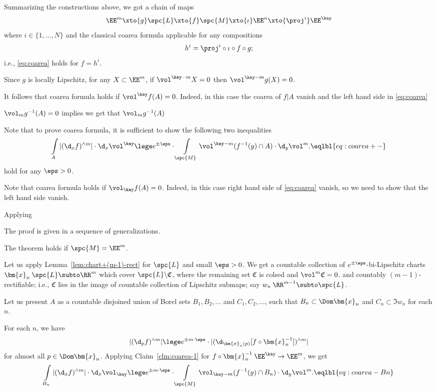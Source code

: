 Summarizing the constructions above, we got a chain of maps
$$\EE^m
\xto{g}
\spc{L}
\xto{f}
\spc{M}
\xto{\iota}\EE^n
\xto{\proj^i}\EE^\kay
$$
where $i\in\{1,\dots,N\}$ and the classical coarea formula applicable 
for any compositions 
$$h^i=\proj^i\circ\iota\circ f\circ g;$$
i.e., \ref{eq:coarea} holds for $f=h^i$.

Since $g$ is locally Lipschitz,
for any $X\subset \EE^m$,
if $\vol^{\kay-m} X=0$ 
then $\vol^{\kay-m} g(X)=0$.

It follows that coarea formula holds if $\vol^\kay f(A)=0$.
Indeed, in this case the coarea of $f|A$ vanish
and the left hand side in \ref{eq:coarea}


$\vol_m g^{-1}(A)=0$ implies 
we get that $\vol_m g^{-1}(A)$


Note that to prove coarea formula, 
it is sufficient to show the following two inequalities
\[
\int\limits_A|(\d_x f)^{\wedge m}|\cdot\d_x\vol^\kay
\lege
e^{\pm\eps}\cdot\int\limits_{\spc{M}}\vol^{\kay-m}( f^{-1}(y)\cap A)\cdot\d_y\vol^m.\eqlbl{eq:coarea+-}
\]
hold for any $\eps>0$.


Note that coarea formula holds if $\vol_\kay f(A)=0$.
Indeed, in this case right hand side of \ref{eq:coarea} vanish,
so we need to show that the left hand side vanish.

Applying 


 



The proof is given in a sequence of generalizations.

\begin{clm}{}\label{clm:coarea-2}
The theorem holds if $\spc{M}=\EE^m$.
\end{clm}

Let us apply Lemma~\ref{lem:chart+(m-1)-rect} for $\spc{L}$ and small $\eps>0$.
We get a countable collection of $e^{\pm\eps}$-bi-Lipschitz charts $\bm{x}_n\:\spc{L}\subto \RR^m$
which cover $\spc{L}\backslash\mathfrak{C}$,
where the remaining set $\mathfrak{C}$ is colsed and $\vol^m\mathfrak{C}=0$.
and countably $(m-1)$-rectifiable;
i.e.,  $\mathfrak{C}$ lies in the image of countable collection of Lipschitz submaps;
say
$w_n\:\RR^{m-1}\subto\spc{L}$.

Let us present $A$ as a countable disjoined union of Borel sets
$B_1,B_2,\dots$ and $C_1,C_2,\dots$, 
such that $B_n\subset \Dom \bm{x}_n$ and $C_n\subset \Im w_n$ for each $n$.

For each $n$, we have 
\[
|(\d_p f)^{\wedge m}|
\lege
e^{\pm m\cdot\eps}\cdot|(\d_{\bm{x}_n(p)} [f\circ \bm{x}_n^{-1}])^{\wedge m}|\]
for almost all $p\in\Dom\bm{x}_n$.
Applying Claim~\ref{clm:coarea-1} for $f\circ \bm{x}_n^{-1}\:\EE^\kay\to\EE^m$, we get
\[\int\limits_{B_n}|(\d_x f)^{\wedge m}|\cdot\d_x\vol_\kay
\lege
e^{\pm m\cdot\eps}
\cdot
\int\limits_{\spc{M}}
\vol_{\kay-m}( f^{-1}(y)\cap B_n)\cdot\d_y\vol^m.
\eqlbl{eq:coarea-Bn}\]

